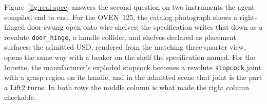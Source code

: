 Figure~\ref{fig:real-spec} answers the second question on two instruments
the agent compiled end to end. For the OVEN~125, the catalog photograph shows
a right-hinged door swung open onto wire shelves; the specification writes
that down as a revolute \texttt{door\_hinge}, a handle collider, and shelves
declared as placement surfaces; the admitted USD, rendered from the matching
three-quarter view, opens the same way with a beaker on the shelf the
specification named. For the burette, the manufacturer's exploded stopcock
becomes a revolute \texttt{stopcock} joint with a grasp region on its handle,
and in the admitted scene that joint is the part a Lift2 turns. In both rows
the middle column is what made the right column checkable.
